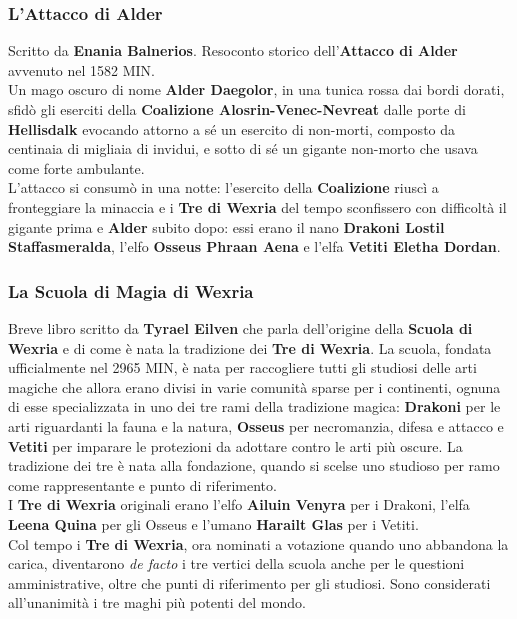 \documentclass[10pt,twoside,onecolumn,openany]{book}
\begin{document}
\subsubsection{L'Attacco di Alder}
Scritto da \textbf{Enania Balnerios}. Resoconto storico dell'\textbf{Attacco di Alder} avvenuto nel 1582 MIN.\\
Un mago oscuro di nome \textbf{Alder Daegolor}, in una tunica rossa dai bordi dorati, sfidò gli eserciti della \textbf{Coalizione Alosrin-Venec-Nevreat} dalle porte di \textbf{Hellisdalk} evocando attorno a sé un esercito di non-morti, composto da centinaia di migliaia di invidui, e sotto di sé un gigante non-morto che usava come forte ambulante.\\
L'attacco si consumò in una notte: l'esercito della \textbf{Coalizione} riuscì a fronteggiare la minaccia e i \textbf{Tre di Wexria} del tempo sconfissero con difficoltà il gigante prima e \textbf{Alder} subito dopo: essi erano il nano \textbf{Drakoni Lostil Staffasmeralda}, l'elfo \textbf{Osseus Phraan Aena} e l'elfa \textbf{Vetiti Eletha Dordan}.
\subsubsection{La Scuola di Magia di Wexria}
Breve libro scritto da \textbf{Tyrael Eilven} che parla dell'origine della \textbf{Scuola di Wexria} e di come è nata la tradizione dei \textbf{Tre di Wexria}.
La scuola, fondata ufficialmente nel 2965 MIN, è nata per raccogliere tutti gli studiosi delle arti magiche che allora erano divisi in varie comunità sparse per i continenti, ognuna di esse specializzata in uno dei tre rami della tradizione magica: \textbf{Drakoni} per le arti riguardanti la fauna e la natura, \textbf{Osseus} per necromanzia, difesa e attacco e \textbf{Vetiti} per imparare le protezioni da adottare contro le arti più oscure. La tradizione dei tre è nata alla fondazione, quando si scelse uno studioso per ramo come rappresentante e punto di riferimento.\\
I \textbf{Tre di Wexria} originali erano l'elfo \textbf{Ailuin Venyra} per i Drakoni, l'elfa \textbf{Leena Quina} per gli Osseus e l'umano \textbf{Harailt Glas} per i Vetiti.\\
Col tempo i \textbf{Tre di Wexria}, ora nominati a votazione quando uno abbandona la carica, diventarono \textit{de facto} i tre vertici della scuola anche per le questioni amministrative, oltre che punti di riferimento per gli studiosi. Sono considerati all'unanimità i tre maghi più potenti del mondo.
\end{document}
